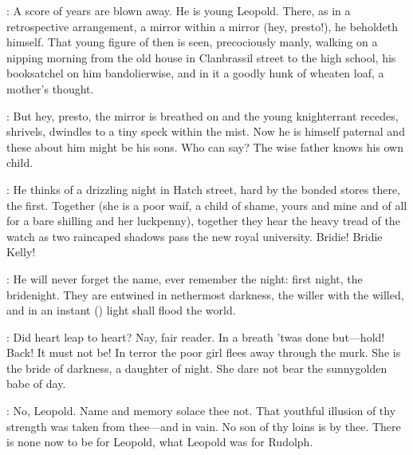 \documentclass[12pt]{article}
\begin{document}
: A score of years are blown away. He is young Leopold.
There, as in a retrospective arrangement, a mirror within a
mirror (hey, presto!), he beholdeth himself. That young figure of then is
seen, precociously manly, walking on a nipping morning from the old house
in Clanbrassil street to the high school, his booksatchel on him
bandolierwise, and in it a goodly hunk of wheaten loaf, a mother's
thought.

: But hey, presto, the mirror is breathed on and the young
knighterrant recedes, shrivels, dwindles to a tiny speck within the mist.
Now he is himself paternal and these about him might be his sons. Who can
say? The wise father knows his own child.

: He thinks of a drizzling night in Hatch street, hard by the bonded
stores there, the first. Together (she is a poor waif, a child of shame,
yours and mine and of all for a bare shilling and her luckpenny), together
they hear the heavy tread of the watch as two raincaped shadows pass the
new royal university. Bridie! Bridie Kelly!

: He will never forget the name, ever remember the night:
first night, the bridenight. They are entwined in nethermost darkness,
the willer with the willed, and in an instant ()
light shall flood the world.

: Did heart leap to heart? Nay, fair reader. In a breath 'twas
done but---hold! Back! It must not be! In terror the poor girl flees away
through the murk. She is the bride of darkness, a daughter of night. She
dare not bear the sunnygolden babe of day.

: No, Leopold. Name and memory solace thee not.
That youthful illusion of thy strength was taken from
thee---and in vain. No son of thy loins is by thee.
There is none now to be for Leopold, what Leopold was for Rudolph.
\end{document}
